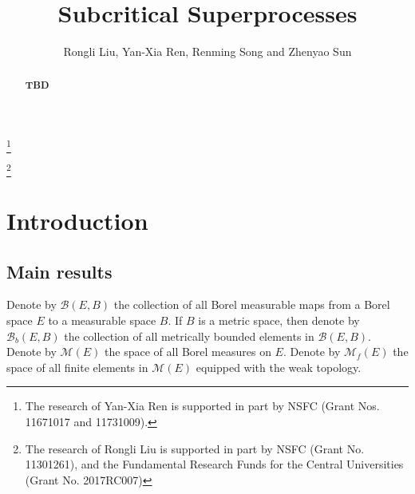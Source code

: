\documentclass[12pt,a4paper]{amsart}
\numberwithin{equation}{section}
\theoremstyle{plain}
\theoremstyle{definition}
\begin{document}
\title {Subcritical Superprocesses }
\author
[R. Liu, Y.-X. Ren, R. Song and Z. Sun]
{Rongli Liu, Yan-Xia Ren, Renming Song and Zhenyao Sun}
\address{
  Yan-Xia Ren\\
  School of Mathematical Sciences\\
  Peking University\\
  Beijing, P. R. China, 100871}
\thanks{
  The research of Yan-Xia Ren is supported in part by NSFC (Grant Nos. 11671017 and 11731009).}
\address{
  Rongli Liu\\
  Information about Rongli Liu}
\thanks{
  The research of Rongli Liu is supported in part by NSFC
  (Grant No. 11301261), and the Fundamental Research Funds for the Central Universities (Grant No.  2017RC007)}
\address{
  Renming Song\\
  Information about Renming Song}
\address{
  Zhenyao Sun\\
  School of Mathematical Sciences\\
  Peking University\\
  Beijing, P. R. China, 100871}
\begin{abstract}
{\bf TBD}
\end{abstract}
\maketitle
\section{Introduction}
\subsection{Main results}
\label{sec:IR}
Denote by $\mathcal B(E,B)$ the collection of all Borel measurable maps from a Borel space $E$ to a measurable space $B$.
If $B$ is a metric space, then denote by $\mathcal B_b(E,B)$ the collection of all metrically bounded elements in $\mathcal B(E,B)$.
Denote by $\mathcal M(E)$ the space of all Borel measures on $E$. 
Denote by $\mathcal M_f(E)$ the space of all finite elements in $\mathcal M(E)$ equipped with the weak topology. 
\end{document}

